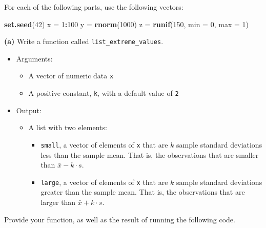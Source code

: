 \documentclass[]{article}
\newenvironment{Shaded}{\begin{snugshade}}{\end{snugshade}}
\newcommand{\KeywordTok}[1]{\textcolor[rgb]{0.13,0.29,0.53}{\textbf{#1}}}
\newcommand{\DataTypeTok}[1]{\textcolor[rgb]{0.13,0.29,0.53}{#1}}
\newcommand{\DecValTok}[1]{\textcolor[rgb]{0.00,0.00,0.81}{#1}}
\newcommand{\StringTok}[1]{\textcolor[rgb]{0.31,0.60,0.02}{#1}}
\newcommand{\OperatorTok}[1]{\textcolor[rgb]{0.81,0.36,0.00}{\textbf{#1}}}
\newcommand{\NormalTok}[1]{#1}
\providecommand{\tightlist}{%
  \setlength{\itemsep}{0pt}\setlength{\parskip}{0pt}}
\begin{document}
For each of the following parts, use the following vectors:

\begin{Shaded}
\begin{Highlighting}[]
\KeywordTok{set.seed}\NormalTok{(}\DecValTok{42}\NormalTok{)}
\NormalTok{x =}\StringTok{ }\DecValTok{1}\OperatorTok{:}\DecValTok{100}
\NormalTok{y =}\StringTok{ }\KeywordTok{rnorm}\NormalTok{(}\DecValTok{1000}\NormalTok{)}
\NormalTok{z =}\StringTok{ }\KeywordTok{runif}\NormalTok{(}\DecValTok{150}\NormalTok{, }\DataTypeTok{min =} \DecValTok{0}\NormalTok{, }\DataTypeTok{max =} \DecValTok{1}\NormalTok{)}
\end{Highlighting}
\end{Shaded}

\textbf{(a)} Write a function called \texttt{list\_extreme\_values}.

\begin{itemize}
\tightlist
\item
  Arguments:

  \begin{itemize}
  \tightlist
  \item
    A vector of numeric data \texttt{x}
  \item
    A positive constant, \texttt{k}, with a default value of \texttt{2}
  \end{itemize}
\item
  Output:

  \begin{itemize}
  \tightlist
  \item
    A list with two elements:

    \begin{itemize}
    \tightlist
    \item
      \texttt{small}, a vector of elements of \texttt{x} that are \(k\)
      sample standard deviations less than the sample mean. That is, the
      observations that are smaller than \(\bar{x} - k \cdot s\).
    \item
      \texttt{large}, a vector of elements of \texttt{x} that are \(k\)
      sample standard deviations greater than the sample mean. That is,
      the observations that are larger than \(\bar{x} + k \cdot s\).
    \end{itemize}
  \end{itemize}
\end{itemize}

Provide your function, as well as the result of running the following
code.
\end{document}
